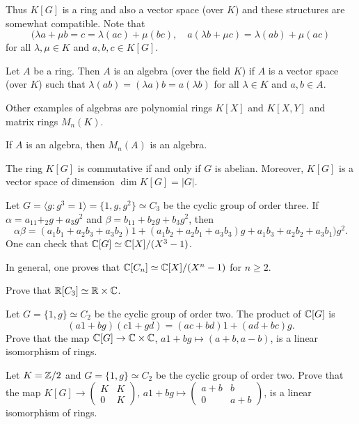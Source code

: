 Thus $K[G]$ is a ring and also a vector space (over $K$) and these structures
are somewhat compatible. Note that
\[
(\lambda a+\mu b=c=\lambda (ac)+\mu (bc),\quad
a(\lambda b+\mu c)=\lambda (ab)+\mu (ac)
\]
for all $\lambda,\mu\in K$ and $a,b,c\in K[G]$. 

\begin{definition}
Let $A$ be a ring. Then $A$ is an algebra (over the field $K$) if $A$ is a vector space (over $K$)
such that $\lambda(ab)=(\lambda a)b=a(\lambda b)$ for all $\lambda\in K$ and $a,b\in A$. 
\end{definition}

Other examples of algebras are 
polynomial rings $K[X]$ and $K[X,Y]$ and matrix rings $M_n(K)$.  

\begin{example}
	If $A$ is an algebra, then $M_n(A)$ is an algebra.	
\end{example}

The ring $K[G]$ is commutative if and only if $G$ is abelian. Moreover,
$K[G]$ is a vector space of dimension $\dim K[G]=|G|$.

\begin{example}
	Let $G=\langle g:g^3=1\rangle=\{1,g,g^2\}\simeq C_3$ be the cyclic group of order three. 
	If $\alpha=a_11+_2g+a_3g^2$ and $\beta=b_11+b_2g+b_3g^2$, then
	\[
		\alpha\beta=(a_1b_1+a_2b_3+a_3b_2)1+(a_1b_2+a_2b_1+a_3b_3)g+a_1b_3+a_2b_2+a_3b_1)g^2.
	\]
	One can check that $\mathbb{C}[G]\simeq\mathbb{C}[X]/(X^3-1)$. 
\end{example}

In general, one proves that $\mathbb{C}[C_n]\simeq\mathbb{C}[X]/(X^n-1)$ for $n\geq2$.

\begin{exercise}
\label{xca:RC3}
	Prove that $\mathbb{R}[C_3]\simeq\mathbb{R}\times\mathbb{C}$. 	
\end{exercise}

\begin{exercise}
	Let $G=\{1,g\}\simeq C_2$ be the cyclic group of order two. The product
	of $\mathbb{C}[G]$ is 
	\[
	(a1+bg)(c1+gd)=(ac+bd)1+(ad+bc)g.
	\]
	Prove that the map $\mathbb{C}[G]\to \mathbb{C}\times \mathbb{C}$, $a1+bg\mapsto (a+b,a-b)$, 
	is a linear isomorphism of rings. 
\end{exercise}

\begin{exercise}
	Let $K=\mathbb{Z}/2$ and $G=\{1,g\}\simeq C_2$ be the cyclic group of order two. 
	Prove that the map $K[G]\to\begin{pmatrix}
		K&K\\
		0&K
	\end{pmatrix}$, $a1+bg\mapsto\begin{pmatrix}
		a+b&b\\
		0&a+b		
	\end{pmatrix}$, is a linear isomorphism of rings.
\end{exercise}

